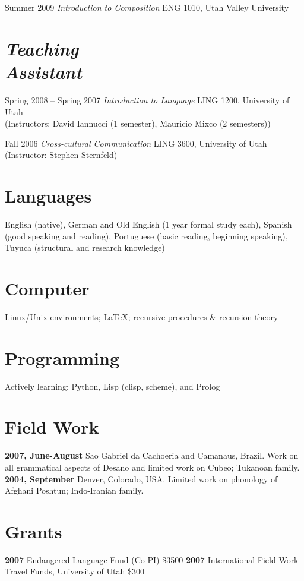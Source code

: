 \documentclass[margin,line]{resume}
\begin{document}
\begin{resume}
Summer 2009 \emph{Introduction to Composition} ENG 1010, Utah Valley University


{\section{\sl Teaching\\ Assistant}}
Spring 2008 -- Spring 2007 \emph{Introduction to Language} LING 1200, University of Utah\\
(Instructors: David Iannucci (1 semester), Mauricio Mixco (2 semesters))

Fall 2006 \emph{Cross-cultural Communication} LING 3600, University of Utah\\
(Instructor: Stephen Sternfeld)

\section{Languages}
English (native), German and Old English (1 year formal study each), Spanish (good speaking and reading), Portuguese (basic reading, beginning speaking), Tuyuca (structural and research knowledge)

\section{Computer} Linux/Unix environments; \LaTeX; recursive procedures \& recursion theory

\section{Programming}
Actively learning: Python, Lisp (clisp, scheme), and Prolog 


\section{Field Work}
{\bf 2007, June-August} Sao Gabriel da Cachoeria and Camanaus, Brazil. Work on all grammatical aspects of Desano and limited work on Cubeo; Tukanoan family. {\bf 2004, September} Denver, Colorado, USA. Limited work on phonology of Afghani Poshtun; Indo-Iranian family.


\section{Grants} 
{\bf 2007} Endangered Language Fund (Co-PI) \$3500  {\bf 2007} International Field Work Travel Funds, University of Utah \$300 



\end{resume}
\end{document}
